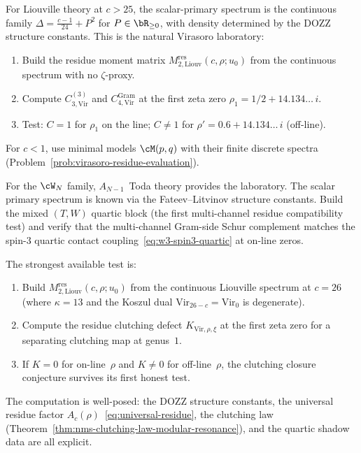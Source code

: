 \begin{problem}%
\label{prob:liouville-laboratory}%
%
For Liouville theory at $c > 25$, the scalar-primary
spectrum is the continuous family
$\Delta = \tfrac{c-1}{24} + P^2$ for $P \in \bR_{\geq 0}$,
with density determined by the DOZZ structure constants.
This is the natural Virasoro laboratory:
\begin{enumerate}[label=\textup{(\roman*)}]
\item
Build the residue moment matrix
$M_{2,\mathrm{Liouv}}^{\mathrm{res}}(c,\rho;u_0)$
from the continuous spectrum with no $\zeta$-proxy.
\item
Compute $C_{3,\mathrm{Vir}}^{(3)}$ and
$C_{4,\mathrm{Vir}}^{\mathrm{Gram}}$ at the first
zeta zero $\rho_1 = 1/2 + 14.134\ldots\,i$.
\item
Test: $C = 1$ for $\rho_1$ on the line;
$C \neq 1$ for $\rho' = 0.6 + 14.134\ldots\,i$
\textup{(}off-line\textup{)}.
\end{enumerate}
For $c < 1$, use minimal models $\cM(p,q)$ with their
finite discrete spectra
(Problem~\ref{prob:virasoro-residue-evaluation}).
\end{problem}

\begin{problem}%
\label{prob:toda-laboratory}%
%
For the $\cW_N$ family, $A_{N-1}$~Toda theory provides the
laboratory. The scalar primary spectrum
is known via the Fateev--Litvinov structure
constants. Build the mixed $(T,W)$ quartic
block (the first multi-channel residue
compatibility test) and verify that the multi-channel
Gram-side Schur complement matches the spin-$3$ quartic
contact coupling~\eqref{eq:w3-spin3-quartic} at on-line
zeros.
\end{problem}

\begin{remark}%
\label{rem:decisive-computation}%
%
The strongest available test is:
\begin{enumerate}[label=\textup{(\roman*)}]
\item
Build $M_{2,\mathrm{Liouv}}^{\mathrm{res}}(c,\rho;u_0)$
from the continuous Liouville spectrum at $c = 26$
\textup{(}where $\kappa = 13$ and the Koszul dual
$\mathrm{Vir}_{26-c} = \mathrm{Vir}_0$ is degenerate\textup{)}.
\item
Compute the residue clutching defect
$K_{\mathrm{Vir},\rho,\xi}$ at the first zeta zero
for a separating clutching map at genus~$1$.
\item
If $K = 0$ for on-line~$\rho$ and $K \neq 0$ for
off-line~$\rho$, the clutching closure conjecture
survives its first honest test.
\end{enumerate}
The computation is well-posed: the DOZZ structure
constants, the universal residue factor
$A_c(\rho)$~\eqref{eq:universal-residue},
the clutching law
(Theorem~\ref{thm:nms-clutching-law-modular-resonance}),
and the quartic shadow data are all explicit.
\end{remark}

